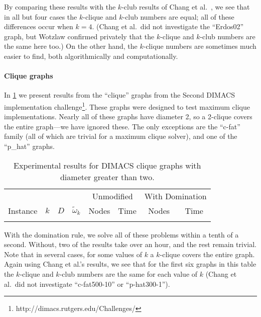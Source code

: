 \documentclass[letterpaper]{article}
\begin{document}
By comparing these results with the $k$-club results of Chang et al.\ , we see that
in all but four cases the $k$-clique and $k$-club numbers are equal; all of these differences occur
when $k = 4$. (Chang et al.\ did not investigate the ``Erdos02'' graph, but Wotzlaw
 confirmed privately that the $k$-clique and $k$-club numbers are the same here
too.) On the other hand, the $k$-clique numbers are sometimes much easier to find, both
algorithmically and computationally.

\paragraph{Clique graphs}

In \cref{table:clique} we present results from the ``clique'' graphs from the
Second DIMACS implementation challenge\footnote{http://dimacs.rutgers.edu/Challenges/}. These
graphs were designed to test maximum clique implementations. Nearly all of these graphs have
diameter 2, so a 2-clique covers the entire graph---we have ignored these. The only exceptions are
the ``c-fat'' family (all of which are trivial for a maximum clique solver), and one of the
``p\_hat'' graphs.

\begin{table}
    \scriptsize\setlength{\tabcolsep}{5pt} %
    \centering
    \begin{tabular}{l c rr rr rr}
        \toprule
        & & & & \multicolumn{2}{c}{Unmodified} & \multicolumn{2}{c}{With Domination} \\
    \cmidrule(lr){5-6}
    \cmidrule(lr){7-8}
    Instance & \multicolumn{1}{c}{$k$} & \multicolumn{1}{c}{$D$} & \multicolumn{1}{c}{$\tilde{\omega}_k$} &
    \multicolumn{1}{c}{Nodes} & \multicolumn{1}{c}{Time} &
    \multicolumn{1}{c}{Nodes} & \multicolumn{1}{c}{Time} \\
    \midrule
    {gen-table-dimacs}
    \bottomrule
\end{tabular}
\caption{Experimental results for DIMACS clique graphs with diameter greater
    than two.}\label{table:clique}
\end{table}

With the domination rule, we solve all of these problems within a tenth of a second. Without, two of
the results take over an hour, and the rest remain trivial. Note that in several cases, for some
values of $k$ a $k$-clique covers the entire graph.  Again using Chang et al.'s results, we see that for the first six graphs in this table the $k$-clique and $k$-club
numbers are the same for each value of $k$ (Chang et al.\ did not investigate ``c-fat500-10'' or
``p-hat300-1'').
\end{document}
